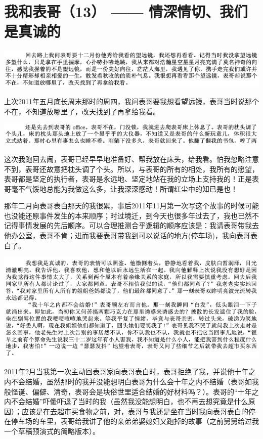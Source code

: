 \documentclass[9pt, b5paper]{article}
\begin{document}
\section{我和表哥（13） —— 情深情切、我们是真诚的}
\label{sec:orgd599f45}

\begin{center}
\includegraphics[width=.9\linewidth]{./pic/p1p57-2.png}
\end{center}

上次2011年五月底长周末那时的周四，我问表哥要我想看望远镜，表哥当时说那个不在，不知道放哪里了，改天找到了再拿给我看。 

\begin{center}
\includegraphics[width=.9\linewidth]{./pic/p1p67-7.png}
\end{center}

这次我跑回去闹，表哥已经早早地准备好、帮我放在床头，给我看。怕我忽略注意不到，表哥还故意把枕头调了个头。所以，与表哥的所有的相处，我所有的愿望，表哥都是坚定的执行者，表哥是永远地、坚定地站在我的立场上支持我的！正是表哥毫不气馁地总能为我做这么多，让我深深感动！所谓红尘中的知已是也！

那年二月向表哥表白那天的我很累，事后2011年11月第一次写这个故事的时候可能也没能还原事件发生的本来顺序；时过境迁，到今天也很多年过去了，我也已然不记得事情发展的先后顺序。可以合理推测合乎逻辑的顺序应该是：我请表哥带我去他办公室，表哥不肯；进而我要表哥带我到可以说话的地方(停车场)，我向表哥表白了。

\begin{center}
\includegraphics[width=.9\linewidth]{./pic/p1p50-3.png}
\end{center}

2011年2月当我第一次主动回表哥家向表哥表白时，表哥拒绝了我，并说他十年之内不会结婚，虽然那时的我并没能想明白表哥为什么会十年之内不结婚（表哥如我般怪诞、偏僻、清奇，表哥会是块俗世里适合结婚的好材料吗？）。表哥的“十年之内不会结婚”吓傻吓退了当时的我（虽然我没能想明白，也不再去想究竟是什么原因）；应该是在去超市买食物之前，对，表哥与我还是坐在当时我向表哥表白的停在停车场的车里，表哥给我讲了他的亲弟弟娶媳妇又跑掉的故事（之前舅舅给过我一个草稿预演式的简略版本）。
\end{document}
